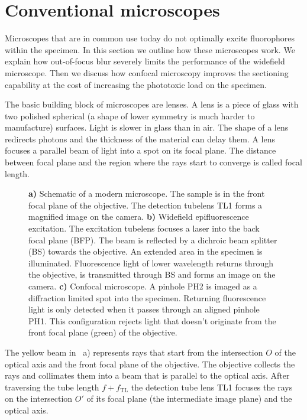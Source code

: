 
\section{Conventional microscopes}
\begin{summary}
  Microscopes that are in common use today do not optimally excite
  fluorophores within the specimen. In this section we outline how
  these microscopes work. We explain how out-of-focus blur severely
  limits the performance of the widefield microscope. Then we discuss
  how confocal microscopy improves the sectioning capability at the
  cost of increasing the phototoxic load on the specimen.
\end{summary}
The basic building block of microscopes are lenses. A lens is a piece
of glass with two polished spherical (a shape of lower symmetry is
much harder to manufacture) surfaces. Light is slower in glass than in
air. The shape of a lens redirects photons and the thickness of the
material can delay them. A lens focuses a parallel beam of light into
a spot on its focal plane. The distance between focal plane and the
region where the rays start to converge is called focal length.
\begin{figure}[!hbt]
  \centering
  
  \caption{{\bf a)} Schematic of a modern microscope. The sample is in
    the front focal plane of the objective. The detection tubelens TL1
    forms a magnified image on the camera. {\bf b)} Widefield
    epifluorescence excitation. The excitation tubelens focuses a
    laser into the back focal plane (BFP). The beam is reflected by a
    dichroic beam splitter (BS) towards the objective. An extended
    area in the specimen is illuminated. Fluorescence light of lower
    wavelength returns through the objective, is transmitted through
    BS and forms an image on the camera. {\bf c)} Confocal
    microscope. A pinhole PH2 is imaged as a diffraction limited spot
    into the specimen. Returning fluorescence light is only detected
    when it passes through an aligned pinhole PH1. This configuration
    rejects light that doesn't originate from the front focal plane
    (green) of the objective.}
  \label{fig:widefield-microscope}
\end{figure}

The yellow beam in ~a) represents
rays that start from the intersection $O$ of the optical axis and the
front focal plane of the objective. The objective collects the rays
and collimates them into a beam that is parallel to the optical
axis. After traversing the tube length $f+f_\textrm{TL}$ the detection
tube lens TL1 focuses the rays on the intersection $O'$ of its focal
plane (the intermediate image plane) and the optical axis.

